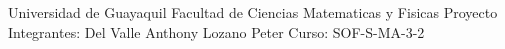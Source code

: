 \begin{center}
Universidad de Guayaquil
Facultad de Ciencias Matematicas y Fisicas
Proyecto
Integrantes:
Del Valle Anthony
Lozano Peter
Curso: SOF-S-MA-3-2
\end{center}



